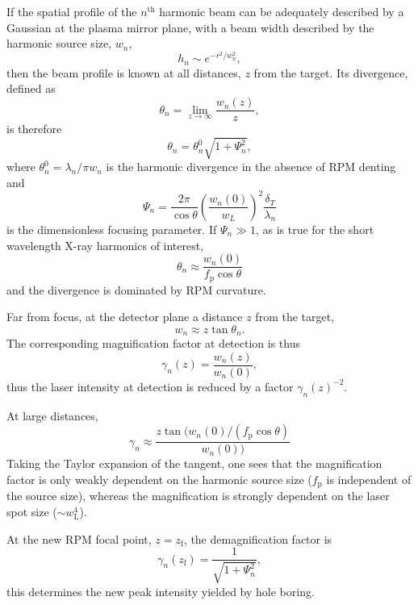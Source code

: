 If the spatial profile of the $n^\mathrm{th}$ harmonic beam can be adequately described by a Gaussian at the plasma mirror plane, with a beam width described by the harmonic source size, $w_n$,
\begin{equation}
	h_n \sim e^{-r^2/w_n^2},
\end{equation}
then the beam profile is known at all distances, $z$ from the target. Its divergence, defined as 
\begin{equation}
	\theta_n = \lim_{z\to\infty} \frac{w_n(z)}{z},
\end{equation}
is therefore
\begin{equation}
	\theta_n = \theta^0_n\sqrt{1+\Psi^2_n},
\end{equation}
where $\theta^0_n = \lambda_n/\pi w_n$ is the harmonic divergence in the absence of RPM denting and
\begin{equation}
	\Psi_n = \frac{2\pi}{\cos\theta}\left(\frac{w_n(0)}{w_L}\right)^2\frac{\delta_T}{\lambda_n}
\end{equation}
is the dimensionless focusing parameter. If $\Psi_n \gg 1$, as is true for the short wavelength X-ray harmonics of interest, 
\begin{equation}
	\theta_n \approx \frac{w_n(0)}{f_\mathrm{p}\cos\theta}
\end{equation}
and the divergence is dominated by RPM curvature. 

Far from focus, at the detector plane a distance $z$ from the target,
\begin{equation}
	w_{n} \approx z\tan\theta_n.
\end{equation}
The corresponding magnification factor at detection is thus 
\begin{equation}
	\gamma_n(z) = \frac{w_n(z)}{w_n(0)},
\end{equation}
thus the laser intensity at detection is reduced by a factor $\gamma_n(z)^{-2}$.

At large distances,
\begin{equation}
	\gamma_n \approx \frac{z\tan(w_n(0)/(f_\mathrm{p}\cos\theta)}{w_n(0))}
\end{equation}
Taking the Taylor expansion of the tangent, one sees that the magnification factor is only weakly dependent on the harmonic source size ($f_\mathrm{p}$ is independent of the source size), whereas the magnification is strongly dependent on the laser spot size ($\sim w_\mathrm{L}^4$).

At the new \ac{RPM} focal point, $z = z_\mathrm{f}$, the demagnification factor is \cite{vincentiOpticalPropertiesRelativistic2014}
\begin{equation}
	\gamma_n(z_\mathrm{f}) = \frac{1}{\sqrt{1+\Psi_n^2}},
\end{equation}
this determines the new peak intensity yielded by hole boring.

